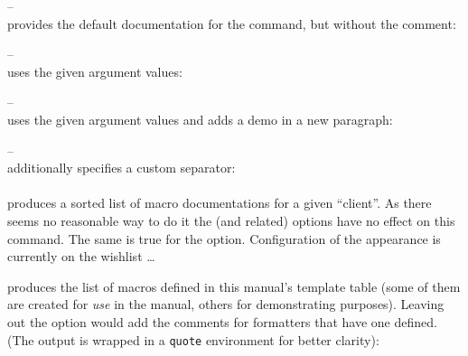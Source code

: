 \documentclass{scrartcl}
\begin{document}

\medskip
\noindent \texttt{} --\\
provides the default documentation for the command, but without the comment:


\medskip
\noindent \texttt{} --\\
uses the given argument values:


\medskip
\noindent \texttt{} --\\
uses the given argument values and adds a demo in a new paragraph:


\medskip
\noindent \texttt{} --\\
additionally specifies a custom separator:



\paragraph{\texttt{}}

produces a sorted list of macro documentations for a given “client”.  As there seems no reasonable way to do it the  (and related) options have no effect on this command.  The same is true for the  option.
Configuration of the appearance is currently on the wishlist \dots

\medskip

\noindent \texttt{} produces the
list of macros defined in this manual's template table (some of them are created
for \emph{use} in the manual, others for demonstrating purposes).  Leaving out
the  option would add the comments for formatters that have
one defined. (The output is wrapped in a \texttt{quote} environment for better clarity):
\end{document}
